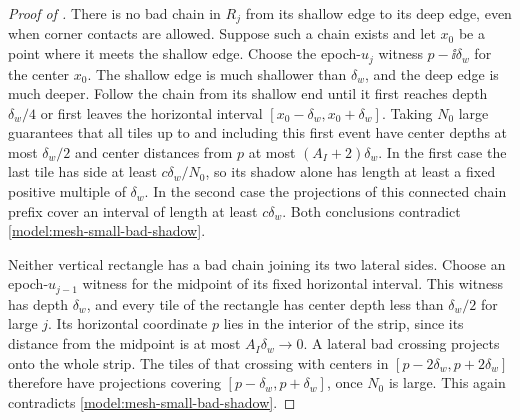\begin{proof}[Proof of ]
There is no bad chain in \(R_j\) from its shallow edge to its deep
edge, even when corner contacts are allowed.  Suppose such a chain
exists and let \(x_0\) be a point where it meets the shallow edge.
Choose the epoch-\(u_j\) witness \(p-\ii\delta_w\) for the center
\(x_0\).  The shallow edge is much shallower than \(\delta_w\), and
the deep edge is much deeper.  Follow the chain from its shallow end
until it first reaches depth \(\delta_w/4\) or first leaves the
horizontal interval \([x_0-\delta_w,x_0+\delta_w]\).  Taking \(N_0\)
large guarantees that all tiles up to and including this first event
have center depths at most \(\delta_w/2\) and center distances from
\(p\) at most \((A_I+2)\delta_w\).  In the first case the last tile
has side at least \(c\delta_w/N_0\), so its shadow alone has length
at least a fixed positive multiple of \(\delta_w\).  In the second
case the projections of this connected chain prefix cover an interval
of length at least \(c\delta_w\).  Both conclusions contradict
\eqref{model:mesh-small-bad-shadow}.

Neither vertical rectangle has a bad chain joining its two lateral
sides.  Choose an epoch-\(u_{j-1}\) witness for the midpoint of its
fixed horizontal interval.  This witness has depth \(\delta_w\),
and every tile of the rectangle has center depth less than
\(\delta_w/2\) for large \(j\).  Its horizontal coordinate \(p\)
lies in the interior of the strip, since its distance from the
midpoint is at most \(A_I\delta_w\to0\).  A lateral bad crossing
projects onto the whole strip.  The tiles of that crossing with
centers in \([p-2\delta_w,p+2\delta_w]\) therefore have projections
covering \([p-\delta_w,p+\delta_w]\), once \(N_0\) is large.  This
again contradicts \eqref{model:mesh-small-bad-shadow}.


\end{proof}
